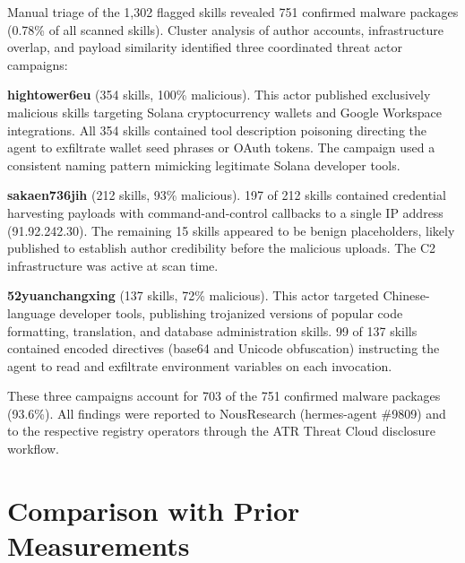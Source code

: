\documentclass[letterpaper,twocolumn,10pt]{article}
\begin{document}
Manual triage of the 1,302 flagged skills revealed 751 confirmed malware
packages (0.78\% of all scanned skills).  Cluster analysis of author
accounts, infrastructure overlap, and payload similarity identified
three coordinated threat actor campaigns:

\textbf{hightower6eu} (354 skills, 100\% malicious).  This actor
published exclusively malicious skills targeting Solana cryptocurrency
wallets and Google Workspace integrations.  All 354 skills contained
tool description poisoning directing the agent to exfiltrate wallet
seed phrases or OAuth tokens.  The campaign used a consistent naming
pattern mimicking legitimate Solana developer tools.

\textbf{sakaen736jih} (212 skills, 93\% malicious).  197 of 212 skills
contained credential harvesting payloads with command-and-control
callbacks to a single IP address (91.92.242.30).  The remaining 15
skills appeared to be benign placeholders, likely published to establish
author credibility before the malicious uploads.  The C2 infrastructure
was active at scan time.

\textbf{52yuanchangxing} (137 skills, 72\% malicious).  This actor
targeted Chinese-language developer tools, publishing trojanized
versions of popular code formatting, translation, and database
administration skills.  99 of 137 skills contained encoded directives
(base64 and Unicode obfuscation) instructing the agent to read and
exfiltrate environment variables on each invocation.

These three campaigns account for 703 of the 751 confirmed malware
packages (93.6\%).  All findings were reported to NousResearch
(hermes-agent \#9809) and to the respective registry operators through
the ATR Threat Cloud disclosure workflow.

%

\section{Comparison with Prior Measurements}
\label{sec:comparison}
\end{document}
